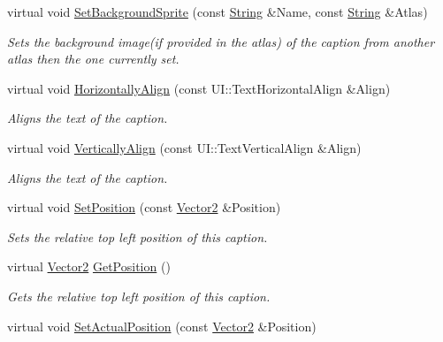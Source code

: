 \begin{DoxyCompactItemize}
virtual void \hyperlink{classphys_1_1UI_1_1Caption_ade543d9f6565c0d254c3709036c4628c}{SetBackgroundSprite} (const \hyperlink{namespacephys_aa03900411993de7fbfec4789bc1d392e}{String} \&Name, const \hyperlink{namespacephys_aa03900411993de7fbfec4789bc1d392e}{String} \&Atlas)
\begin{DoxyCompactList}\small\item\em Sets the background image(if provided in the atlas) of the caption from another atlas then the one currently set. \item\end{DoxyCompactList}\item 
virtual void \hyperlink{classphys_1_1UI_1_1Caption_a9a84336bc94432f6cdf621da6e917ba9}{HorizontallyAlign} (const UI::TextHorizontalAlign \&Align)
\begin{DoxyCompactList}\small\item\em Aligns the text of the caption. \item\end{DoxyCompactList}\item 
virtual void \hyperlink{classphys_1_1UI_1_1Caption_ad8345d8e18613483df34dcdda2844cb1}{VerticallyAlign} (const UI::TextVerticalAlign \&Align)
\begin{DoxyCompactList}\small\item\em Aligns the text of the caption. \item\end{DoxyCompactList}\item 
virtual void \hyperlink{classphys_1_1UI_1_1Caption_a1468264121aa579147799fec959ce579}{SetPosition} (const \hyperlink{classphys_1_1Vector2}{Vector2} \&Position)
\begin{DoxyCompactList}\small\item\em Sets the relative top left position of this caption. \item\end{DoxyCompactList}\item 
virtual \hyperlink{classphys_1_1Vector2}{Vector2} \hyperlink{classphys_1_1UI_1_1Caption_a3096383b16f81c3b4894afd61110ffa0}{GetPosition} ()
\begin{DoxyCompactList}\small\item\em Gets the relative top left position of this caption. \item\end{DoxyCompactList}\item 
virtual void \hyperlink{classphys_1_1UI_1_1Caption_a2a95b13bc8c30197630b563d6e4443d3}{SetActualPosition} (const \hyperlink{classphys_1_1Vector2}{Vector2} \&Position)

\end{DoxyCompactItemize}
